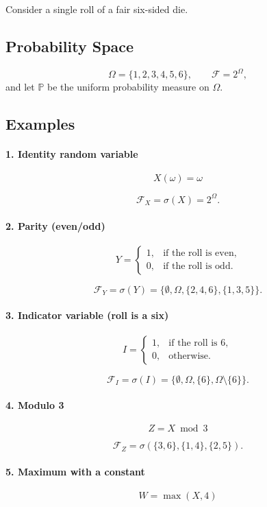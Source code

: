 \documentclass[11pt]{article}
\begin{document}
Consider a single roll of a fair six-sided die.

\subsection*{Probability Space}
$$
\Omega = \{1,2,3,4,5,6\}, \qquad
\mathcal{F} = 2^\Omega,
$$
and let $ \mathbb{P} $ be the uniform probability measure on $ \Omega $.

\subsection*{Examples}

\paragraph{1. Identity random variable}
$$
X(\omega) = \omega
$$

$$
\mathcal{F}_X = \sigma(X) = 2^\Omega.
$$

\paragraph{2. Parity (even/odd)}
$$
Y =
\begin{cases}
1, & \text{if the roll is even}, \\
0, & \text{if the roll is odd}.
\end{cases}
$$

$$
\mathcal{F}_Y
= \sigma(Y)
= \{\emptyset, \Omega, \{2,4,6\}, \{1,3,5\}\}.
$$

\paragraph{3. Indicator variable (roll is a six)}
$$
I =
\begin{cases}
1, & \text{if the roll is } 6, \\
0, & \text{otherwise}.
\end{cases}
$$

$$
\mathcal{F}_I
= \sigma(I)
= \{\emptyset, \Omega, \{6\}, \Omega \setminus \{6\}\}.
$$

\paragraph{4. Modulo 3}
$$
Z = X \bmod 3
$$

$$
\mathcal{F}_Z
= \sigma(\{3,6\}, \{1,4\}, \{2,5\}).
$$

\paragraph{5. Maximum with a constant}
$$
W = \max(X,4)
$$
\end{document}
